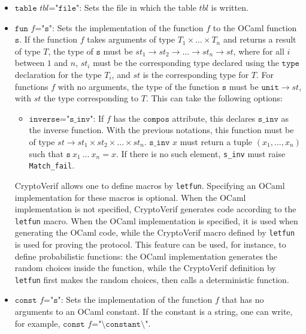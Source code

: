 \begin{itemize}
\item $\texttt{table }tbl\texttt{="file"}$: Sets the file in which the table
  $tbl$ is written.
\item $\texttt{fun }f\texttt{="s"}$: 
  Sets the implementation of the function $f$ to the OCaml function
  $\texttt{s}$.  If the function $f$ takes arguments of type $T_1\times
  \ldots \times T_n$ and returns a result of type $T$, the type of
  $\texttt{s}$ must be $st_1\rightarrow st_2\rightarrow\ldots\rightarrow
  st_n\rightarrow st$, where for all $i$ between $1$ and $n$, $st_i$ must
  be the corresponding type declared using the $\texttt{type}$ declaration
  for the type $T_i$, and $st$ is the corresponding type for $T$. For
  functions $f$ with no arguments, the type of the function $\texttt{s}$
  must be $\texttt{unit}\rightarrow st$, with $st$ the type corresponding
  to $T$.  This can take the following options:
  \begin{itemize}
  \item $\texttt{inverse="s\_inv"}$:
    If $f$ has the $\texttt{compos}$ attribute, this declares
    $\texttt{s\_inv}$ as the inverse function.
    With the previous notations, this function must be of type
    $st \rightarrow st_1\times st_2\times\ldots\times st_n$.
    $\texttt{s\_inv\ }x$ must return a tuple $(x_1, \ldots, x_n)$
    such that $\texttt{s}\ x_1\ \ldots\ x_n = x$. If there is no such element,
    \texttt{s\_inv} must raise \texttt{Match\_fail}.
  \end{itemize}
  CryptoVerif allows one to define macros by \texttt{letfun}. Specifying
  an OCaml implementation for these macros is optional. When the OCaml
  implementation is not specified, CryptoVerif generates code according to 
  the \texttt{letfun} macro. When the OCaml
  implementation is specified, it is used when generating the OCaml code,
  while the CryptoVerif macro defined by \texttt{letfun} is used for
  proving the protocol. This feature can be used, for instance, to define
  probabilistic functions: the OCaml implementation generates the
  random choices inside the function, while the CryptoVerif definition
  by \texttt{letfun} first makes the random choices, then calls a
  deterministic function.

\item $\texttt{const }f\texttt{="s"}$: Sets the implementation of the
  function $f$ that has no arguments to an OCaml constant. If the constant
  is a string, one can write, for example, $\texttt{const }f\texttt{="\char`\\"constant\char`\\""}$.
\end{itemize}
